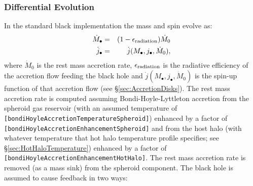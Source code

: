 \subsubsection{Differential Evolution}

In the standard black implementation the mass and spin evolve as:
\begin{eqnarray}
\dot{M}_\bullet &=& (1-\epsilon_{\rm radiation}) \dot{M}_0 \\
\dot{j}_\bullet &=& \dot{j}(M_\bullet,j_\bullet,\dot{M}_0),
\end{eqnarray}
where $\dot{M}_0$ is the rest mass accretion rate, $\epsilon_{\rm radiation}$ is the radiative efficiency of the accretion flow feeding the black hole and $\dot{j}(M_\bullet,j_\bullet,\dot{M}_0)$ is the spin-up function of that accretion flow (see \S\ref{sec:AccretionDisks}). The rest mass accretion rate is computed assuming Bondi-Hoyle-Lyttleton accretion from the spheroid gas reservoir (with an assumed temperature of {\tt [bondiHoyleAccretionTemperatureSpheroid]}) enhanced by a factor of {\tt [bondiHoyleAccretionEnhancementSpheroid]} and from the host halo (with whatever temperature that hot halo temperature profile specifies; see \S\ref{sec:HotHaloTemperature}) enhanced by a factor of {\tt [bondiHoyleAccretionEnhancementHotHalo]}. The rest mass accretion rate is removed (as a mass sink) from the spheroid component. The black hole is assumed to cause feedback in two ways:
